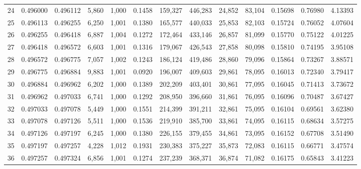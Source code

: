 \begin{tabular}{rrrrrrrrrrrrr}
24  &  0.496000 &  0.496112 &  5,860 &  1,000 &                                     0.1458 &  159,327 &  446,283 &   24,852 &   83,104 &  0.15698 &  0.76980 &  4.13393 \\
25  &  0.496113 &  0.496255 &  6,250 &  1,001 &                                     0.1380 &  165,577 &  440,033 &   25,853 &   82,103 &  0.15724 &  0.76052 &  4.07604 \\
26  &  0.496255 &  0.496418 &  6,887 &  1,004 &                                     0.1272 &  172,464 &  433,146 &   26,857 &   81,099 &  0.15770 &  0.75122 &  4.01225 \\
27  &  0.496418 &  0.496572 &  6,603 &  1,001 &                                     0.1316 &  179,067 &  426,543 &   27,858 &   80,098 &  0.15810 &  0.74195 &  3.95108 \\
28  &  0.496572 &  0.496775 &  7,057 &  1,002 &                                     0.1243 &  186,124 &  419,486 &   28,860 &   79,096 &  0.15864 &  0.73267 &  3.88571 \\
29  &  0.496775 &  0.496884 &  9,883 &  1,001 &                                     0.0920 &  196,007 &  409,603 &   29,861 &   78,095 &  0.16013 &  0.72340 &  3.79417 \\
30  &  0.496884 &  0.496962 &  6,202 &  1,000 &                                     0.1389 &  202,209 &  403,401 &   30,861 &   77,095 &  0.16045 &  0.71413 &  3.73672 \\
31  &  0.496962 &  0.497033 &  6,741 &  1,000 &                                     0.1292 &  208,950 &  396,660 &   31,861 &   76,095 &  0.16096 &  0.70487 &  3.67427 \\
32  &  0.497033 &  0.497078 &  5,449 &  1,000 &                                     0.1551 &  214,399 &  391,211 &   32,861 &   75,095 &  0.16104 &  0.69561 &  3.62380 \\
33  &  0.497078 &  0.497126 &  5,511 &  1,000 &                                     0.1536 &  219,910 &  385,700 &   33,861 &   74,095 &  0.16115 &  0.68634 &  3.57275 \\
34  &  0.497126 &  0.497197 &  6,245 &  1,000 &                                     0.1380 &  226,155 &  379,455 &   34,861 &   73,095 &  0.16152 &  0.67708 &  3.51490 \\
35  &  0.497197 &  0.497257 &  4,228 &  1,012 &                                     0.1931 &  230,383 &  375,227 &   35,873 &   72,083 &  0.16115 &  0.66771 &  3.47574 \\
36  &  0.497257 &  0.497324 &  6,856 &  1,001 &                                     0.1274 &  237,239 &  368,371 &   36,874 &   71,082 &  0.16175 &  0.65843 &  3.41223 \\

\end{tabular}
